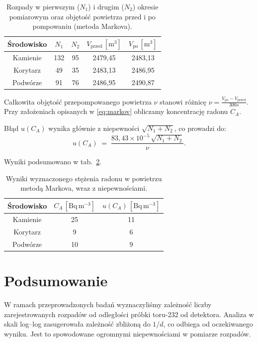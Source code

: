 \documentclass[12pt]{article}
\begin{document}
\begin{table}[H]
	\centering
	\begin{tabular}{c|cc|cc}
		\toprule
		Środowisko & $N_1$ & $N_2$ & $V_{\text{przed}}\,[\mathrm{m^3}]$ & $V_{\text{po}}\,[\mathrm{m^3}]$ \\
		\midrule
		Kamienie   & 132   & 95    & 2479{,}45                          & 2483{,}13                       \\
		Korytarz   & 49    & 35    & 2483{,}13                          & 2486{,}95                       \\
		Podwórze   & 91    & 76    & 2486{,}95                          & 2490{,}87                       \\
		\bottomrule
	\end{tabular}
	\caption{Rozpady w pierwszym ($N_1$) i drugim ($N_2$) okresie pomiarowym oraz objętość powietrza przed i po pompowaniu (metoda Markova).}
	\label{tab:density_measurments}
\end{table}

Całkowita objętość przepompowanego powietrza \(\nu\) stanowi różnicę \(\nu=\frac{V_{\text{po}}-V_{\text{przed}}}{300s}\). Przy założeniach opisanych w \ref{eq:markov} obliczamy koncentrację radonu \(C_A\).

Błąd \(u(C_A)\) wynika głównie z niepewności \(\sqrt{N_1 + N_2}\), co prowadzi do:
\[
	u(C_A) \;=\; \frac{83{,}43 \times 10^{-5}\,\sqrt{N_1 + N_2}}{\nu}.
\]

Wyniki podsumowano w tab.~\ref{tab:concentration_results}.

\begin{table}[H]
	\centering
	\begin{tabular}{c|cc}
		\toprule
		Środowisko & $C_A\,[\mathrm{Bq\,m^{-3}}]$ & $u(C_A)\,[\mathrm{Bq\,m^{-3}}]$ \\
		\midrule
		Kamienie   & 25                           & 11                              \\
		Korytarz   & 9                            & 6                               \\
		Podwórze   & 10                           & 9                               \\
		\bottomrule
	\end{tabular}
	\caption{Wyniki wyznaczonego stężenia radonu w powietrzu metodą Markova, wraz z niepewnościami.}
	\label{tab:concentration_results}
\end{table}


\section{Podsumowanie}
W ramach przeprowadzonych badań wyznaczyliśmy zależność liczby zarejestrowanych rozpadów od odległości próbki toru-232 od detektora. Analiza w skali log–log zasugerowała zależność zbliżoną do \(1/d\), co odbiega od oczekiwanego wyniku. Jest to spowodowane ogromnymi niepewnościami w pomiarze rozpadów.
\end{document}
